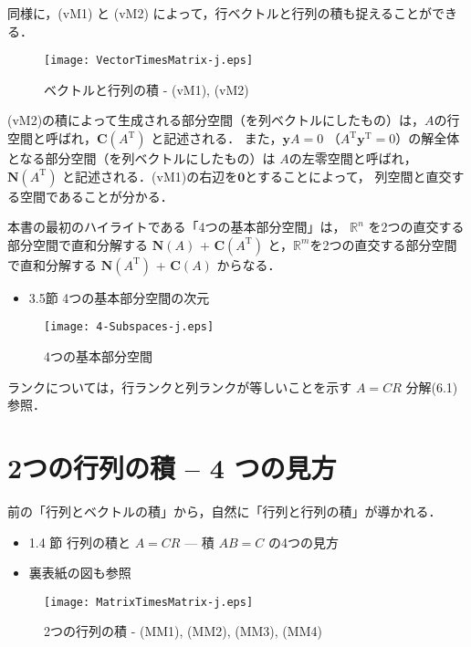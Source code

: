 \documentclass[letterpaper]{article}
\DeclareRobustCommand\transp{^{\mathrm{T}}}
\begin{document}
同様に，(vM1) と (vM2) によって，行ベクトルと行列の積も捉えることができる．

\begin{figure}[H]
  \centering
  \texttt{[image: VectorTimesMatrix-j.eps]}
  \caption{ベクトルと行列の積 - (vM1), (vM2)}
\end{figure}

(vM2)の積によって生成される部分空間（を列ベクトルにしたもの）は，$A$の行空間と呼ばれ，$\mathbf{C}(A\transp)$ と記述される．
また，$\bm{y}A=0$ （$A\transp \bm{y}\transp=0$）の解全体となる部分空間（を列ベクトルにしたもの）は
$A$の左零空間と呼ばれ，$\mathbf{N}(A\transp)$ と記述される．(vM1)の右辺を$\bm{0}$とすることによって，
列空間と直交する空間であることが分かる．

本書の最初のハイライトである「4つの基本部分空間」は， $\mathbb{R}^n$ を2つの直交する部分空間で直和分解する
$\mathbf{N}(A)$ + $\mathbf{C}(A\transp)$ と，$\mathbb{R}^m$を2つの直交する部分空間で直和分解する
$\mathbf{N}(A\transp)$ + $\mathbf{C}(A)$ からなる．

\begin{itemize}
  \item 3.5節 4つの基本部分空間の次元
\end{itemize} 

\begin{figure}[H]
  \centering
  \texttt{[image: 4-Subspaces-j.eps]}
  \caption{4つの基本部分空間}
\end{figure}

ランクについては，行ランクと列ランクが等しいことを示す $A=CR$ 分解(6.1)参照．

\section{2つの行列の積 -- 4 つの見方}

前の「行列とベクトルの積」から，自然に「行列と行列の積」が導かれる．

\begin{itemize}
  \item 1.4 節 行列の積と $A=CR$ \; --- 積 $AB=C$ の4つの見方
  \item 裏表紙の図も参照
\end{itemize} 


\begin{figure}[H]
  \centering
  \texttt{[image: MatrixTimesMatrix-j.eps]}
  \caption{2つの行列の積 - (MM1), (MM2), (MM3), (MM4)}
\end{figure}
\end{document}
